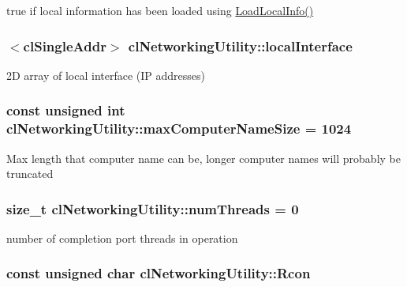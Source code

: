 \label{classcl_networking_utility_a766d28dd514254451214cb339c6d009b}
true if local information has been loaded using \hyperlink{classcl_networking_utility_ad6fcd956b0311f0cfa6750fa26d4822c}{LoadLocalInfo()} \hypertarget{classcl_networking_utility_a13b355810ffbc409a87fe6c208ecaa3b}{
\subsubsection[{localInterface}]{$<${\bf clSingleAddr}$>$ {\bf clNetworkingUtility::localInterface}}}
\label{classcl_networking_utility_a13b355810ffbc409a87fe6c208ecaa3b}
2D array of local interface (IP addresses) \hypertarget{classcl_networking_utility_a7b9a1b2da15e1d1174070a2aca194940}{
\subsubsection[{maxComputerNameSize}]{\setlength{\rightskip}{0pt plus 5cm}const unsigned int {\bf clNetworkingUtility::maxComputerNameSize} = 1024}}
\label{classcl_networking_utility_a7b9a1b2da15e1d1174070a2aca194940}
Max length that computer name can be, longer computer names will probably be truncated \hypertarget{classcl_networking_utility_a7f033e0caca77ee312fad6b54c224dad}{
\subsubsection[{numThreads}]{\setlength{\rightskip}{0pt plus 5cm}size\_\-t {\bf clNetworkingUtility::numThreads} = 0}}
\label{classcl_networking_utility_a7f033e0caca77ee312fad6b54c224dad}
number of completion port threads in operation \hypertarget{classcl_networking_utility_af4c64288219ccb6c22d3ea07ec19b291}{
\subsubsection[{Rcon}]{\setlength{\rightskip}{0pt plus 5cm}const unsigned char {\bf clNetworkingUtility::Rcon}}}
